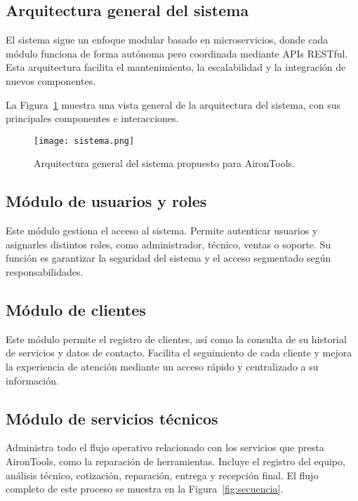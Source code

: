 	\subsection*{Arquitectura general del sistema}
	
	El sistema sigue un enfoque modular basado en microservicios, donde cada módulo funciona de forma autónoma pero coordinada mediante APIs RESTful. Esta arquitectura facilita el mantenimiento, la escalabilidad y la integración de nuevos componentes.
	
	La Figura~\ref{fig:arquitectura} muestra una vista general de la arquitectura del sistema, con sus principales componentes e interacciones.
	
	\begin{figure}[H]
		\centering
		\texttt{[image: sistema.png]}
		\caption{Arquitectura general del sistema propuesto para AironTools.}
		\label{fig:arquitectura}
	\end{figure}
	
	\subsection*{Módulo de usuarios y roles}
	
	Este módulo gestiona el acceso al sistema. Permite autenticar usuarios y asignarles distintos roles, como administrador, técnico, ventas o soporte. Su función es garantizar la seguridad del sistema y el acceso segmentado según responsabilidades.
	
	\subsection*{Módulo de clientes}
	
	Este módulo permite el registro de clientes, así como la consulta de su historial de servicios y datos de contacto. Facilita el seguimiento de cada cliente y mejora la experiencia de atención mediante un acceso rápido y centralizado a su información.
	
	\subsection*{Módulo de servicios técnicos}
	
	Administra todo el flujo operativo relacionado con los servicios que presta AironTools, como la reparación de herramientas. Incluye el registro del equipo, análisis técnico, cotización, reparación, entrega y recepción final. El flujo completo de este proceso se muestra en la Figura~\ref{fig:secuencia}.
	
